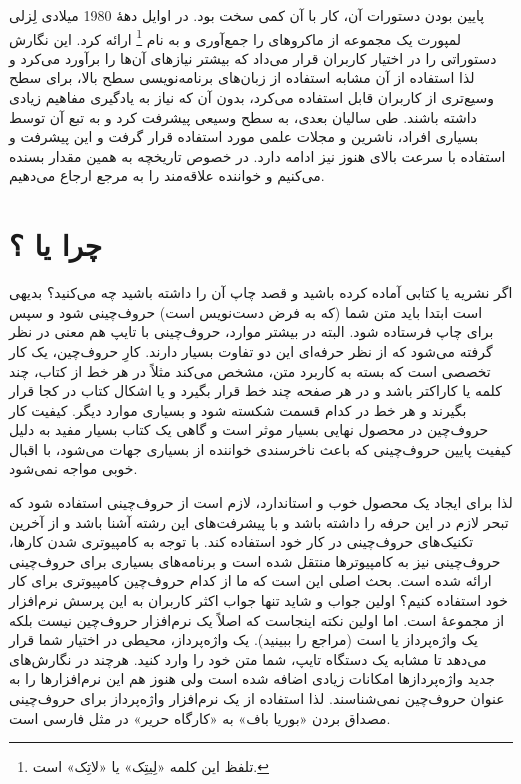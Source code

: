 پایین بودن دستورات آن، کار با آن کمی سخت بود. در اوایل دهۀ 1980 میلادی 
لِزلی لمپورت
یک مجموعه از ماکروهای \lr{\TeX} را جمع‌آوری و به نام \lr{\LaTeX}\footnote{تلفظ این
کلمه «لِیتِک» یا «لاتِک» است.} ارائه کرد. این نگارش دستوراتی را در اختیار کاربران قرار می‌داد
که بیشتر نیازهای آن‌ها را برآورد می‌کرد و لذا استفاده از آن مشابه استفاده از زبان‌های
برنامه‌نویسی سطح بالا، برای سطح وسیع‌تری از کاربران قابل استفاده می‌کرد، بدون آن که
نیاز به یادگیری مفاهیم زیادی داشته باشند. طی سالیان بعدی، \lr{\TeX} به سطح وسیعی
پیشرفت کرد و به تبع آن توسط بسیاری افراد، ناشرین و مجلات علمی مورد استفاده 
قرار گرفت و این پیشرفت و استفاده با سرعت بالای هنوز نیز ادامه دارد. 
در خصوص تاریخچه به همین مقدار بسنده می‌کنیم و خواننده علاقه‌مند را به مرجع \cite{TeXHis} ارجاع می‌دهیم.

\section{چرا \lr{\TeX} یا \lr{\LaTeX}؟}
اگر نشریه یا کتابی آماده کرده باشید و قصد چاپ آن را داشته باشید چه می‌کنید؟ بدیهی
است ابتدا باید متن شما (که به فرض دست‌نویس است) حروف‌چینی شود و سپس برای 
چاپ فرستاده شود. البته در بیشتر موارد، حروف‌چینی با تایپ هم معنی در نظر گرفته 
می‌شود که از نظر حرفه‌ای این دو تفاوت بسیار دارند. کارِ حروف‌چین، یک کار تخصصی است
که بسته به کاربرد متن، مشخص می‌کند مثلاً در هر خط از کتاب، چند کلمه یا کاراکتر باشد
و در هر صفحه چند خط قرار بگیرد و یا اشکال کتاب در کجا قرار بگیرند و هر خط در 
کدام قسمت شکسته شود و بسیاری موارد دیگر. کیفیت کار حروف‌چین در محصول نهایی
بسیار موثر است و گاهی یک کتاب بسیار مفید به دلیل کیفیت پایین حروف‌چینی
که باعث ناخرسندی خواننده از بسیاری جهات می‌شود، با اقبال خوبی مواجه نمی‌شود.

لذا برای ایجاد یک محصول خوب و استاندارد، لازم است از حروف‌چینی استفاده
شود که تبحر لازم در این حرفه را داشته باشد و با پیشرفت‌های این رشته آشنا باشد
و از آخرین تکنیک‌های حروف‌چینی در کار خود استفاده کند. با توجه به کامپیوتری
شدن کارها، حروف‌چینی نیز به کامپیوترها منتقل شده است و برنامه‌های بسیاری
برای حروف‌چینی ارائه شده است. بحث اصلی این است که ما از کدام حروف‌چین
کامپیوتری برای کار خود استفاده کنیم؟  اولین جواب و شاید تنها جواب اکثر کاربران
به این پرسش نرم‌افزار  از مجموعۀ  است. اما اولین نکته اینجاست
که  اصلاً یک نرم‌افزار حروف‌چین نیست بلکه یک واژه‌پرداز یا 
 است (مراجع \cite{Word,beuty,Art} را ببینید). یک واژه‌پرداز، محیطی در اختیار شما قرار 
می‌دهد تا مشابه یک دستگاه تایپ، شما متن خود را وارد کنید. هرچند در نگارش‌های
جدید واژه‌پردازها امکانات زیادی اضافه شده است ولی هنوز هم این نرم‌افزارها را
به عنوان حروف‌چین نمی‌شناسند. لذا استفاده از یک نرم‌افزار واژه‌پرداز برای حروف‌چینی
مصداق بردن «بوریا باف» به «کارگاه حریر» در مثل فارسی است.

